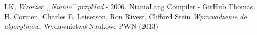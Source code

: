 \documentclass[licencjacka]{pracamgr}
\begin{document}
\appendix

\begin{thebibliography}{99}

 \href{https://www.mimuw.edu.pl/~chrzaszc/BPJ20067/nianio.pdf}{LK, \textit{Wzorzec ,,Nianio'' przykład} - 2006}.
 \href{https://github.com/nianiolang/nl}{NianioLang Compiler - GitHub}
 Thomas H. Cormen, Charles E. Leiserson, Ron Rivest, Clifford Stein \textit{Wprowadzenie do algorytmów}, Wydawnictwo Naukowe PWN (2013)


\end{thebibliography}
\end{document}
